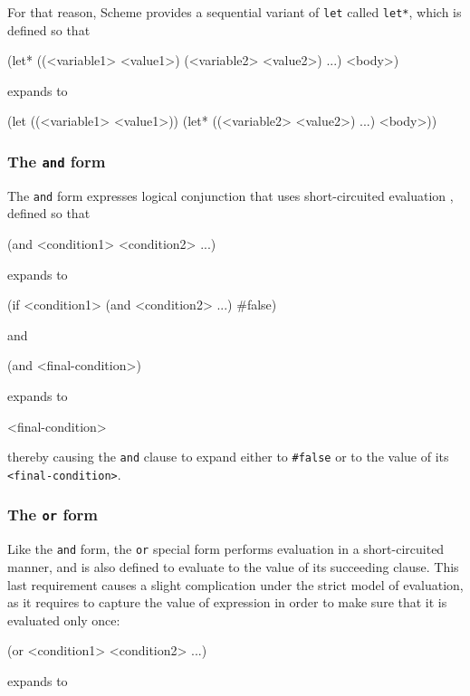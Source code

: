 For that reason, Scheme provides a sequential variant of \texttt{let}
called \texttt{let*}, which is defined so that
\begin{Snippet}
(let* ((<variable1> <value1>)
       (<variable2> <value2>)
       ...)
  <body>)
\end{Snippet}
expands to
\begin{Snippet}
(let ((<variable1> <value1>))
  (let* ((<variable2> <value2>)
         ...)
    <body>))
\end{Snippet}

\subsubsection{The \texttt{and} form}

The \texttt{and} form expresses logical conjunction that uses
short-circuited evaluation \cite{McCarthy1960} \cite{Sebesta2008},
defined so that
\begin{Snippet}
(and <condition1> <condition2> ...)
\end{Snippet}
expands to
\begin{Snippet}
(if <condition1>
    (and <condition2> ...)
    #false)
\end{Snippet}
and
\begin{Snippet}
(and <final-condition>)
\end{Snippet}
expands to
\begin{Snippet}
<final-condition>
\end{Snippet}
thereby causing the \texttt{and} clause to expand either to \texttt{\#false}
or to the value of its \texttt{<final-condition>}.

\subsubsection{The \texttt{or} form}

Like the \texttt{and} form, the \texttt{or} special form performs
evaluation in a short-circuited manner, and is also defined to evaluate
to the value of its succeeding clause. This last requirement causes
a slight complication under the strict model of evaluation, as it
requires to capture the value of expression in order to make sure that it
is evaluated only once:

\begin{Snippet}
(or <condition1> <condition2> ...)
\end{Snippet}

expands to 

